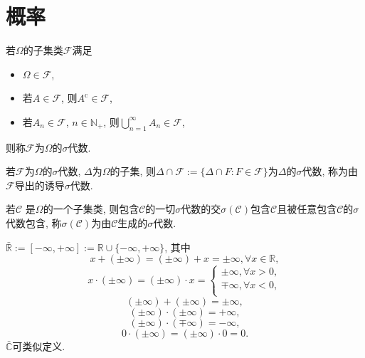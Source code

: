 \chapter{概率}

\begin{definition}
    若$\Omega$的子集类$\mathcal{F}$满足\begin{itemize}
        \item $\Omega\in\mathcal{F}$,
        \item 若$A\in\mathcal{F}$, 则$A^\text{c}\in\mathcal{F}$,
        \item 若$A_n\in\mathcal{F}$, $n\in \mathbb{N}_+$, 则$\bigcup_{n=1}^{\infty}A_n\in\mathcal{F}$,
    \end{itemize}则称$\mathcal{F}$为$\Omega$的$\sigma$代数.
\end{definition}

\begin{definition}
    若$\mathcal{F}$为$\Omega$的$\sigma$代数, $\Delta$为$\Omega$的子集, 则$\Delta\cap\mathcal{F}:=\{\Delta\cap F\colon F\in\mathcal{F}\}$为$\Delta$的$\sigma$代数, 称为由$\mathcal{F}$导出的诱导$\sigma$代数.
\end{definition}

\begin{definition}
    若$\mathcal{C}$ 是$\Omega$的一个子集类, 则包含$\mathcal{C}$的一切$\sigma$代数的交$\sigma(\mathcal{C})$包含$\mathcal{C}$且被任意包含$\mathcal{C}$的$\sigma$代数包含, 称$\sigma(\mathcal{C})$为由$\mathcal{C}$生成的$\sigma$代数.
\end{definition}

\begin{definition}
    $\bar{\mathbb{R} }:=[-\infty,+\infty]:=\mathbb{R}\cup\{-\infty,+\infty\}$, 其中\begin{equation*}
        x+(\pm\infty)=(\pm\infty)+x=\pm\infty, \forall x\in\mathbb{R},
    \end{equation*}\begin{equation*}
        x\cdot(\pm\infty)=(\pm\infty)\cdot x=\begin{cases}
            \pm\infty,\forall x>0,\\
            \mp\infty,\forall x<0,\\
        \end{cases}
    \end{equation*}\begin{equation*}
        (\pm\infty)+(\pm\infty)=\pm\infty,
    \end{equation*}\begin{equation*}
        (\pm\infty)\cdot(\pm\infty)=+\infty,
    \end{equation*}\begin{equation*}
        (\pm\infty)\cdot(\mp\infty)=-\infty,
    \end{equation*}\begin{equation*}
        0\cdot(\pm\infty)=(\pm\infty)\cdot0=0.
    \end{equation*}$\bar{\mathbb{C} }$可类似定义.
\end{definition}

